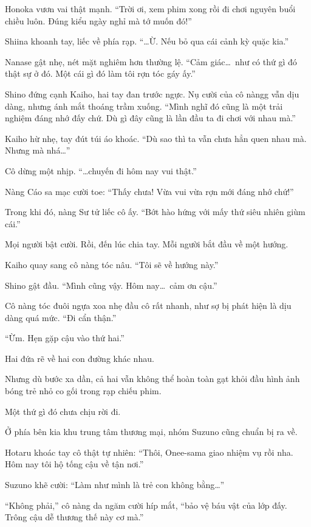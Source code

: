 \documentclass[../main.tex]{subfiles}
\begin{document}
Honoka vươn vai thật mạnh. ``Trời ơi, xem phim xong rồi đi chơi nguyên buổi chiều luôn. Đúng kiểu ngày nghỉ mà tớ muốn đó!''

Shiina khoanh tay, liếc về phía rạp. ``\dots Ừ. Nếu bỏ qua cái cảnh kỳ quặc kia.''

Nanase gật nhẹ, nét mặt nghiêm hơn thường lệ. ``Cảm giác\dots\ như có thứ gì đó thật sự ở đó. Một cái gì đó làm tôi rợn tóc gáy ấy.''

Shino đứng cạnh Kaiho, hai tay đan trước ngực. Nụ cười của cô nàngg vẫn dịu dàng, nhưng ánh mắt thoáng trầm xuống. ``Mình nghĩ đó cũng là một trải nghiệm đáng nhớ đấy chứ. Dù gì đây cũng là lần đầu ta đi chơi với nhau mà.''

Kaiho hừ nhẹ, tay đút túi áo khoác. ``Dù sao thì ta vẫn chưa hẳn quen nhau mà.
Nhưng mà nhá\dots''

Cô dừng một nhịp. ``\dots chuyến đi hôm nay vui thật.''

Nàng Cáo sa mạc cười toe: ``Thấy chưa! Vừa vui vừa rợn mới đáng nhớ chứ!''

Trong khi đó, nàng Sư tử liếc cô ấy. ``Bớt hào hứng với mấy thứ siêu nhiên giùm cái.''

Mọi người bật cười. Rồi, đến lúc chia tay. Mỗi người bắt đầu về một hướng.

Kaiho quay sang cô nàng tóc nâu.
``Tôi sẽ về hướng này.''

Shino gật đầu. ``Mình cũng vậy. Hôm nay\dots\ cảm ơn cậu.''

Cô nàng tóc đuôi ngựa xoa nhẹ đầu cô rất nhanh, như sợ bị phát hiện là dịu dàng quá mức. ``Đi cẩn thận.''

``Ừm. Hẹn gặp cậu vào thứ hai.''

Hai đứa rẽ về hai con đường khác nhau.

Nhưng dù bước xa dần, cả hai vẫn không thể hoàn toàn gạt khỏi đầu hình ảnh bóng trẻ nhỏ co gối trong rạp chiếu phim.

Một thứ gì đó chưa chịu rời đi.

\ct

Ở phía bên kia khu trung tâm thương mại, nhóm Suzuno cũng chuẩn bị ra về.

Hotaru khoác tay cô thật tự nhiên: ``Thôi, Onee-sama giao nhiệm vụ rồi nha. Hôm nay tôi hộ tống cậu về tận nơi.''

Suzuno khẽ cười: ``Làm như mình là trẻ con không bằng\dots''

``Không phải,'' cô nàng da ngăm cười híp mắt, ``bảo vệ báu vật của lớp đấy. Trông cậu dễ thương thế này cơ mà.''
\end{document}
